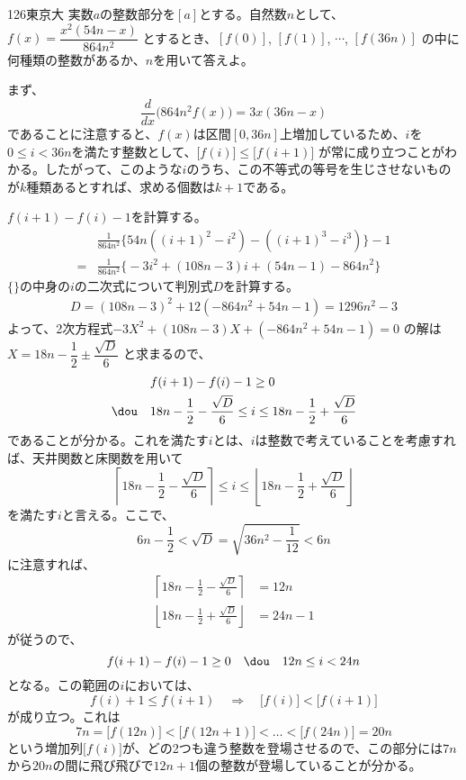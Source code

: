 \begin{thm}{126}{}{東京大}
 実数$a$の整数部分を$[a]$とする。自然数$n$として、$f(x)=\dfrac{x^2(54n-x)}{864n^2}$ とするとき、$[f(0)]$, $[f(1)]$, $\cdots$, $[f(36n)]$ の中に何種類の整数があるか、$n$を用いて答えよ。
\end{thm}

まず、
\[ \frac{d}{dx}\bigl(864n^2f(x)\bigr)=3x(36n-x) \]
であることに注意すると、$f(x)$は区間$[0,36n]$上増加しているため、$i$を$0\le i < 36n$を満たす整数として、$\bigl[f(i)\bigr] \le \bigl[f(i+1)\bigr]$ が常に成り立つことがわかる。したがって、このような$i$のうち、この不等式の等号を生じさせないものが$k$種類あるとすれば、求める個数は$k+1$である。

$f(i+1)-f(i)-1$を計算する。
\begin{align*}
 &\frac{1}{864n^2}\bigl\{54n( (i+1)^2-i^2 )-( (i+1)^3-i^3 )\bigr\} -1 \\
 =&\frac{1}{864n^2}\bigl\{-3i^2+(108n-3)i+(54n-1)-864n^2\bigr\}
\end{align*}
$\{{}\}$の中身の$i$の二次式について判別式$D$を計算する。
\begin{align*}
 D=(108n-3)^2+12(-864n^2+54n-1)=1296n^2-3
\end{align*}
よって、2次方程式$-3X^2+(108n-3)X+(-864n^2+54n-1)=0$ の解は$X=18n-\dfrac{1}{2}\pm\dfrac{\sqrt{D}}{6}$ と求まるので、
\begin{align*}
 &f(i+1)-f(i)-1\ge 0 \\
 \dou\quad & 18n-\frac{1}{2}-\frac{\sqrt{D}}{6}\le i\le 18n-\frac{1}{2}+\frac{\sqrt{D}}{6}
\end{align*}
であることが分かる。これを満たす$i$とは、$i$は整数で考えていることを考慮すれば、天井関数と床関数を用いて
\[ \left\lceil 18n-\frac{1}{2}-\frac{\sqrt{D}}{6}\right\rceil \le i\le \left\lfloor 18n-\frac{1}{2}+\frac{\sqrt{D}}{6}\right\rfloor \]
を満たす$i$と言える。ここで、
\[ 6n-\frac{1}{2} < \sqrt{D}=\sqrt{36n^2-\frac{1}{12}} < 6n \]
に注意すれば、
\begin{align*}
 \left\lceil 18n-\frac{1}{2}-\frac{\sqrt{D}}{6}\right\rceil &= 12n \\
 \left\lfloor 18n-\frac{1}{2}+\frac{\sqrt{D}}{6}\right\rfloor &= 24n-1
\end{align*}
が従うので、
\[ f(i+1)-f(i)-1 \ge 0 \quad\dou\quad 12n\le i < 24n \]
となる。この範囲の$i$においては、
\[ f(i)+1\le f(i+1) \quad\Rightarrow\quad \bigl[f(i)\bigr] < \bigl[f(i+1)\bigr] \]
が成り立つ。これは
\[ 7n=\bigl[f(12n)\bigr]<\bigl[f(12n+1)\bigr]<\dots <\bigl[f(24n)\bigr]=20n \]
という増加列$\bigl[f(i)\bigr]$が、どの2つも違う整数を登場させるので、この部分には$7n$から$20n$の間に飛び飛びで$12n+1$個の整数が登場していることが分かる。

